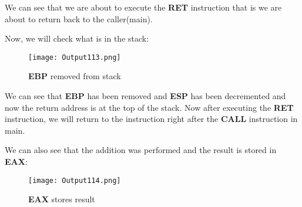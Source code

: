 \documentclass{article}
\begin{document}
We can see that we are about to execute the \textbf{RET} instruction that is we are about to return back to the caller(main).

Now, we will check what is in the stack:
\begin{figure}[h]
	\centering
	\texttt{[image: Output113.png]}
	\caption{\textbf{EBP} removed from stack}
	\label{fig:fig11}
\end{figure}

We can see that \textbf{EBP} has been removed and \textbf{ESP} has been decremented and now the return address is at the top of the stack. Now after executing the \textbf{RET} instruction, we will return to the instruction right after the \textbf{CALL} instruction in main.

\newpage
We can also see that the addition was performed and the result is stored in \textbf{EAX}:
\begin{figure}[h]
	\centering
	\texttt{[image: Output114.png]}
	\caption{\textbf{EAX} stores result}
	\label{fig:fig12}
\end{figure}
\end{document}
